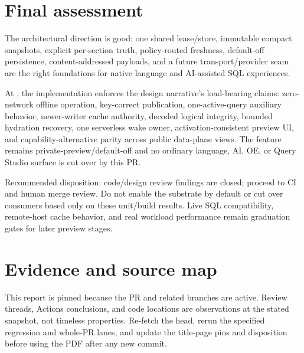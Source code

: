 \documentclass[11pt]{article}
\newcommand{\code}[1]{\texttt{\detokenize{#1}}}
\begin{document}
\section{Final assessment}

\begin{takeawaybox}
The architectural direction is good: one shared lease/store, immutable compact snapshots, explicit per-section truth, policy-routed freshness, default-off persistence, content-addressed payloads, and a future transport/provider seam are the right foundations for native language and AI-assisted SQL experiences.

At \code{69ca292f8}, the implementation enforces the design narrative's load-bearing claims: zero-network offline operation, key-correct publication, one-active-query auxiliary behavior, newer-writer cache authority, decoded logical integrity, bounded hydration recovery, one serverless wake owner, activation-consistent preview UI, and capability-alternative parity across public data-plane views. The feature remains private-preview/default-off and no ordinary language, AI, OE, or Query Studio surface is cut over by this PR.
\end{takeawaybox}

\begin{statusbox}[title={Decision statement}]
Recommended disposition: code/design review findings are closed; proceed to CI and human merge review. Do not enable the substrate by default or cut over consumers based only on these unit/build results. Live SQL compatibility, remote-host cache behavior, and real workload performance remain graduation gates for later preview stages.
\end{statusbox}

\section*{Evidence and source map}

\normalsize
\begin{statusbox}[title={Reproducibility note}]
This report is pinned because the PR and related branches are active. Review threads, Actions conclusions, and code locations are observations at the stated snapshot, not timeless properties. Re-fetch the head, rerun the specified regression and whole-PR lanes, and update the title-page pins and disposition before using the PDF after any new commit.
\end{statusbox}
\end{document}
